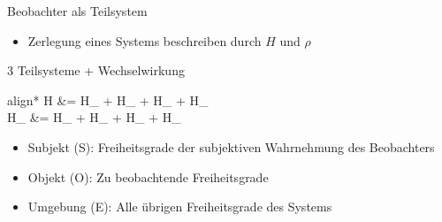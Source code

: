 \begin{frame}{Beobachter als Teilsystem}
	\begin{itemize}
		\item{Zerlegung eines Systems beschreiben durch $H$ und $\rho$}
	\end{itemize}
	\begin{beamerboxesrounded}{3 Teilsysteme + Wechselwirkung}
		\begin{empheq}{align*}
		H &= H_{} + H_{} + H_{} + H_{}\\
		H_{} &= H_{} + H_{} + H_{} + H_{}
		\end{empheq}
		\vspace{-0.5cm}
	\end{beamerboxesrounded} 
	\begin{itemize}
		\item{Subjekt (S): Freiheitsgrade der subjektiven Wahrnehmung des Beobachters}
		\item{Objekt (O): Zu beobachtende Freiheitsgrade}
		\item{Umgebung (E): Alle übrigen Freiheitsgrade des Systems}
	\end{itemize}
\end{frame}
